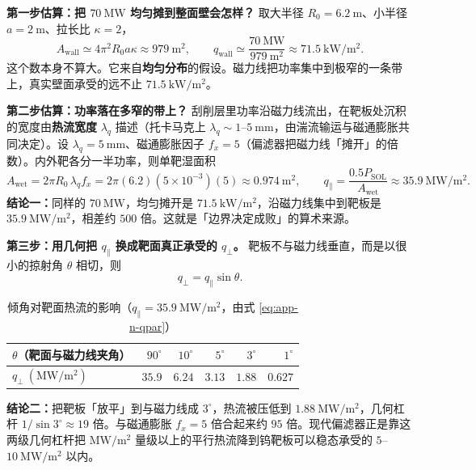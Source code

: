\textbf{第一步估算：把 $70\ \mathrm{MW}$ 均匀摊到整面壁会怎样？} 取大半径 $R_0=6.2\ \mathrm{m}$、小半径 $a=2\ \mathrm{m}$、拉长比 $\kappa=2$，
\begin{equation}
A_{\mathrm{wall}}\simeq4\pi^2R_0a\kappa\approx979\ \mathrm{m^2},
\qquad
q_{\mathrm{wall}}\simeq\frac{70\ \mathrm{MW}}{979\ \mathrm{m^2}}\approx71.5\ \mathrm{kW/m^2}.
\end{equation}
这个数本身不算大。它来自\textbf{均匀分布}的假设。磁力线把功率集中到极窄的一条带上，真实壁面承受的远不止 $71.5\ \mathrm{kW/m^2}$。

\textbf{第二步估算：功率落在多窄的带上？} 刮削层里功率沿磁力线流出，在靶板处沉积的宽度由\textbf{热流宽度} $\lambda_q$ 描述（托卡马克上 $\lambda_q\sim1$--$5\ \mathrm{mm}$，由湍流输运与磁通膨胀共同决定）。设 $\lambda_q=5\ \mathrm{mm}$、磁通膨胀因子 $f_x=5$（偏滤器把磁力线「摊开」的倍数）。内外靶各分一半功率，则单靶湿面积
\begin{equation}
A_{\mathrm{wet}}=2\pi R_0\,\lambda_q f_x
=2\pi(6.2)(5\times10^{-3})(5)\approx0.974\ \mathrm{m^2},
\qquad
q_\parallel=\frac{0.5P_{\mathrm{SOL}}}{A_{\mathrm{wet}}}\approx35.9\ \mathrm{MW/m^2}.
\label{eq:app-n-qpar}
\end{equation}
\textbf{结论一：}同样的 $70\ \mathrm{MW}$，均匀摊开是 $71.5\ \mathrm{kW/m^2}$，沿磁力线集中到靶板是 $35.9\ \mathrm{MW/m^2}$，相差约 $500$ 倍。这就是「边界决定成败」的算术来源。

\textbf{第三步：用几何把 $q_\parallel$ 换成靶面真正承受的 $q_\perp$。} 靶板不与磁力线垂直，而是以很小的掠射角 $\theta$ 相切，则
\begin{equation}
q_\perp=q_\parallel\sin\theta .
\label{eq:app-n-qperp}
\end{equation}
\begin{table}[htbp]
\centering
\small
\caption{倾角对靶面热流的影响（$q_\parallel=35.9\ \mathrm{MW/m^2}$，由式 \eqref{eq:app-n-qpar}）}
\label{tab:app-n-tilt}
\begin{tabular}{@{}lrrrrr@{}}
\toprule
$\theta$（靶面与磁力线夹角） & $90^\circ$ & $10^\circ$ & $5^\circ$ & $3^\circ$ & $1^\circ$ \\
\midrule
$q_\perp\ (\mathrm{MW/m^2})$ & $35.9$ & $6.24$ & $3.13$ & $1.88$ & $0.627$ \\
\bottomrule
\end{tabular}
\end{table}
\textbf{结论二：}把靶板「放平」到与磁力线成 $3^\circ$，热流被压低到 $1.88\ \mathrm{MW/m^2}$，几何杠杆 $1/\sin3^\circ\approx19$ 倍。与磁通膨胀 $f_x=5$ 倍合起来约 $95$ 倍。现代偏滤器正是靠这两级几何杠杆把 $\mathrm{MW/m^2}$ 量级以上的平行热流降到钨靶板可以稳态承受的 $5$--$10\ \mathrm{MW/m^2}$ 以内。


